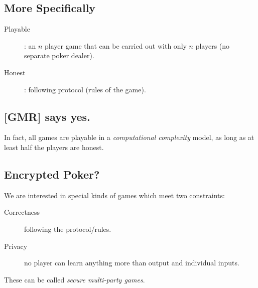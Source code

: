 \documentclass[10pt]{beamer}
\begin{document}
\begin{frame}

\subsection{More Specifically}

\begin{description}
\item[Playable]: an $n$ player game that can be carried out with only
$n$ players (no separate poker dealer).
\item[Honest]: following protocol (rules of the game).
\end{description}

\subsection{[GMR] says yes.}
In fact, all games are playable in a \textit{computational complexity} model,
as long as at least half the players are honest.

\subsection{Encrypted Poker?}
We are interested in special kinds of games which meet two constraints:

\begin{description}
\item[Correctness] following the protocol/rules.
\item[Privacy] no player can learn anything more than output and individual inputs.
\end{description}

These can be called \textit{secure multi-party games}.


\end{frame}
\end{document}

